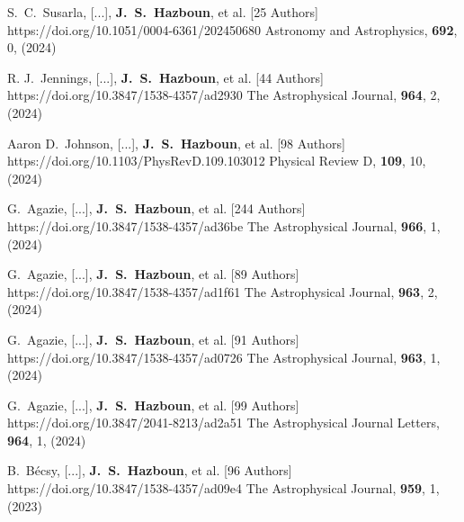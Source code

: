          {S.~C.~{Susarla}, [...], \textbf{J.~S.~{Hazboun}}, et al. [25 Authors]}
         {https://doi.org/10.1051/0004-6361/202450680}
         {{Astronomy and Astrophysics}, \textbf{692}, 0, (2024)}

         {R. J.~{Jennings}, [...], \textbf{J.~S.~{Hazboun}}, et al. [44 Authors]}
         {https://doi.org/10.3847/1538-4357/ad2930}
         {{The Astrophysical Journal}, \textbf{964}, 2, (2024)}

         {Aaron D.~{Johnson}, [...], \textbf{J.~S.~{Hazboun}}, et al. [98 Authors]}
         {https://doi.org/10.1103/PhysRevD.109.103012}
         {{Physical Review D}, \textbf{109}, 10, (2024)}

         {G.~{Agazie}, [...], \textbf{J.~S.~{Hazboun}}, et al. [244 Authors]}
         {https://doi.org/10.3847/1538-4357/ad36be}
         {{The Astrophysical Journal}, \textbf{966}, 1, (2024)}

         {G.~{Agazie}, [...], \textbf{J.~S.~{Hazboun}}, et al. [89 Authors]}
         {https://doi.org/10.3847/1538-4357/ad1f61}
         {{The Astrophysical Journal}, \textbf{963}, 2, (2024)}

         {G.~{Agazie}, [...], \textbf{J.~S.~{Hazboun}}, et al. [91 Authors]}
         {https://doi.org/10.3847/1538-4357/ad0726}
         {{The Astrophysical Journal}, \textbf{963}, 1, (2024)}

         {G.~{Agazie}, [...], \textbf{J.~S.~{Hazboun}}, et al. [99 Authors]}
         {https://doi.org/10.3847/2041-8213/ad2a51}
         {{The Astrophysical Journal Letters}, \textbf{964}, 1, (2024)}

         {B.~{B{\'e}csy}, [...], \textbf{J.~S.~{Hazboun}}, et al. [96 Authors]}
         {https://doi.org/10.3847/1538-4357/ad09e4}
         {{The Astrophysical Journal}, \textbf{959}, 1, (2023)}

